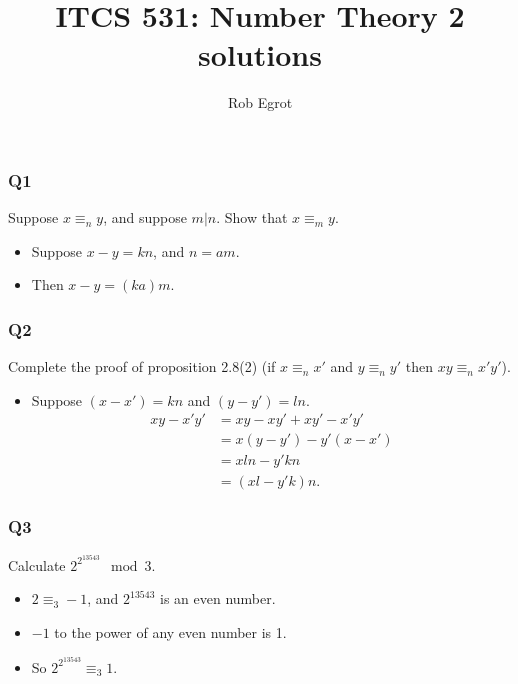 \documentclass[handout]{beamer}
\title{ITCS 531: Number Theory 2 solutions}
\date{}
\author{Rob Egrot}
\begin{document}
\begin{frame}
\titlepage
\end{frame}

\begin{frame}
\frametitle{Q1}
Suppose $x\equiv_n y$, and suppose $m|n$. Show that $x\equiv_m y$.
\vspace{1cm}
\begin{itemize}
\item Suppose $x-y= kn$, and $n = am$. 
\item Then $x-y = (ka)m$.
\end{itemize}
\end{frame}

\begin{frame}
\frametitle{Q2}
Complete the proof of proposition 2.8(2) (if $x\equiv_n x'$ and $y\equiv_n y'$ then $xy \equiv_n x'y'$).
\vspace{0.5cm}
\begin{itemize}
\item Suppose $(x-x') = kn$ and $(y-y') = ln$. 
\begin{align*}xy - x'y' &= xy - xy' + xy' - x'y'\\
&= x(y-y') - y'(x-x') \\
&= xln - y'kn \\
&= (xl-y'k)n. 
\end{align*}
\end{itemize}
\end{frame}

\begin{frame}
\frametitle{Q3}
Calculate $2^{2^{13543}}\mod 3$.
\vspace{0.5cm}
\begin{itemize}
\item $2 \equiv_3 -1$, and $2^{13543}$ is an even number. 
\vspace{0.3cm}
\item $-1$ to the power of any even number is 1. 
\vspace{0.3cm}
\item So $2^{2^{13543}}\equiv_3 1$. 
\end{itemize}
\end{frame}
\end{document}
